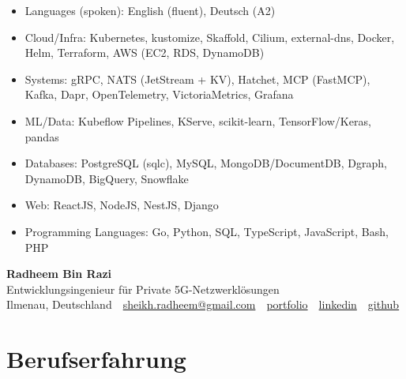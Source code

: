 \documentclass[10pt,a4paper]{resume}
\makeatletter
\newcommand{\Portfolio}{https://radheem.github.io/my-cv}
\newcommand{\PortfolioText}{portfolio}
\newcommand{\GitHub}{https://github.com/radheem}
\newcommand{\LinkedIn}{https://www.linkedin.com/in/radheem-razi}
\newcommand{\Email}{sheikh.radheem@gmail.com}
\makeatother
\begin{document}
\begin{itemize}[leftmargin=1.4em,nosep,topsep=2pt]
  \item Languages (spoken): English (fluent), Deutsch (A2)
  \item Cloud/Infra: Kubernetes, kustomize, Skaffold, Cilium, external-dns, Docker, Helm, Terraform, AWS (EC2, RDS, DynamoDB)
  \item Systems: gRPC, NATS (JetStream + KV), Hatchet, MCP (FastMCP), Kafka, Dapr, OpenTelemetry, VictoriaMetrics, Grafana
  \item ML/Data: Kubeflow Pipelines, KServe, scikit-learn, TensorFlow/Keras, pandas
  \item Databases: PostgreSQL (sqlc), MySQL, MongoDB/DocumentDB, Dgraph, DynamoDB, BigQuery, Snowflake
  \item Web: ReactJS, NodeJS, NestJS, Django
  \item Programming Languages: Go, Python, SQL, TypeScript, JavaScript, Bash, PHP
\end{itemize}

\clearpage
{}

\begin{center}
  {\huge\bfseries Radheem Bin Razi}\\[3pt]
  {\large Entwicklungsingenieur für Private 5G-Netzwerklösungen}\\[6pt]
  \small
  Ilmenau, Deutschland \,\textbar\,
  \href{mailto:\Email}{\Email} \,\textbar\,
  \href{\Portfolio}{\PortfolioText} \,\textbar\,
  \href{\LinkedIn}{linkedin} \,\textbar\,
  \href{\GitHub}{github}
\end{center}
\vspace{2pt}

\section{Berufserfahrung}
\end{document}
